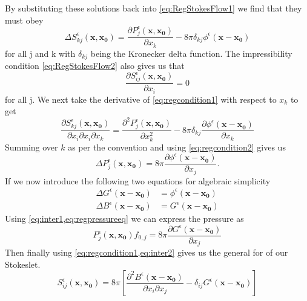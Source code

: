 By substituting these solutions back into \cref{eq:RegStokesFlow1} we find that they must obey
\begin{equation}
\label{eq:regcondition1}
    \Delta S^\epsilon_{kj}(\mathbf{x},\mathbf{x_0}) = \frac{\partial P^\epsilon_{j}(\mathbf{x},\mathbf{x_0})}{\partial x_k} - 8\pi\delta_{kj}\phi^\epsilon(\mathbf{x}-\mathbf{x_0})
\end{equation}
for all j and k with $\delta_{kj}$ being the Kronecker delta function. The impressibility condition \cref{eq:RegStokesFlow2} also gives us that
\begin{equation}
\label{eq:regcondition2}
    \frac{\partial S^\epsilon_{ij}(\mathbf{x},\mathbf{x_0})}{\partial x_i} = 0
\end{equation}
for all j. We next take the derivative of \cref{eq:regcondition1} with respect to $x_k$ to get
\begin{equation*}
    \frac{\partial S^\epsilon_{kj}(\mathbf{x},\mathbf{x_0})}{\partial x_i \partial x_i \partial x_k} = \frac{\partial^2 P^\epsilon_{j}(\mathbf{x},\mathbf{x_0})}{\partial x_k^2} - 8\pi\delta_{kj}\frac{\partial \phi^\epsilon(\mathbf{x}-\mathbf{x_0})}{\partial x_k}
\end{equation*}
Summing over $k$ as per the convention and using \cref{eq:regcondition2} gives us
\begin{equation}
\label{eq:regpressureeq}
    \Delta P^\epsilon_{j}(\mathbf{x},\mathbf{x_0}) = 8\pi\frac{\partial \phi^\epsilon(\mathbf{x}-\mathbf{x_0})}{\partial x_j}.
\end{equation}
If we now introduce the following two equations for algebraic simplicity
\begin{subequations}
\label{eq:intermediate}
\begin{align}
    \Delta G^\epsilon(\mathbf{x}-\mathbf{x_0})  &= \phi^\epsilon(\mathbf{x}-\mathbf{x_0}) \label{eq:inter1} \\
    \Delta B^\epsilon(\mathbf{x}-\mathbf{x_0})  &= G^\epsilon(\mathbf{x}-\mathbf{x_0}) \label{eq:inter2}
\end{align}
\end{subequations}
Using \cref{eq:inter1,eq:regpressureeq} we can express the pressure as
\begin{equation}
\label{eq:pressuresol}
    P^\epsilon_{j}(\mathbf{x},\mathbf{x_0})f_{0,j} = 8 \pi \frac{\partial G^\epsilon(\mathbf{x}-\mathbf{x_0})}{\partial x_j}
\end{equation}
Then finally using \cref{eq:regcondition1,eq:inter2} gives us the general for of our Stokeslet.
\begin{equation}
\label{eq:regstokeslet1}
    S_{ij}^\epsilon(\mathbf{x}, \mathbf{x_0}) = 8\pi\left[ \frac{\partial^2 B^\epsilon(\mathbf{x} -\mathbf{x_0})}{\partial x_i \partial x_j} - \delta_{ij}  G^\epsilon(\mathbf{x} -\mathbf{x_0})\right]
\end{equation}
